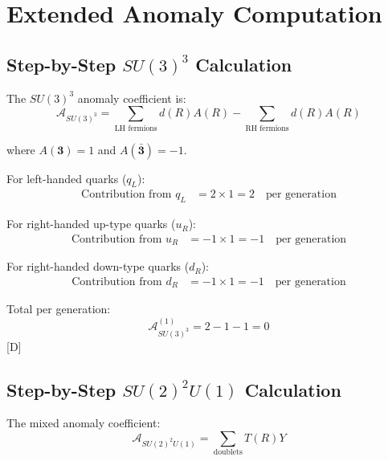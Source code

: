 \documentclass[11pt,a4paper]{article}
\newcommand{\tagD}{\textcolor{blue!70!black}{[D]}}
\begin{document}

\section{Extended Anomaly Computation}
\label{app:extended-anomaly}

\subsection{Step-by-Step $SU(3)^3$ Calculation}

The $SU(3)^3$ anomaly coefficient is:
\begin{equation}
\label{eq:su3-coeff-def}
\mathcal{A}_{SU(3)^3} = \sum_{\text{LH fermions}} d(R) A(R) - \sum_{\text{RH fermions}} d(R) A(R)
\end{equation}

where $A(\mathbf{3}) = 1$ and $A(\bar{\mathbf{3}}) = -1$.

For left-handed quarks ($q_L$):
\begin{align}
\label{eq:qL-su3-anom}
\text{Contribution from } q_L &= 2 \times 1 = 2 \quad \text{per generation}
\end{align}

For right-handed up-type quarks ($u_R$):
\begin{align}
\label{eq:uR-su3-anom}
\text{Contribution from } u_R &= -1 \times 1 = -1 \quad \text{per generation}
\end{align}

For right-handed down-type quarks ($d_R$):
\begin{align}
\label{eq:dR-su3-anom}
\text{Contribution from } d_R &= -1 \times 1 = -1 \quad \text{per generation}
\end{align}

Total per generation:
\begin{equation}
\label{eq:su3-per-gen}
\mathcal{A}_{SU(3)^3}^{(1)} = 2 - 1 - 1 = 0
\end{equation}
\tagD

\subsection{Step-by-Step $SU(2)^2 U(1)$ Calculation}

The mixed anomaly coefficient:
\begin{equation}
\label{eq:su2u1-def}
\mathcal{A}_{SU(2)^2 U(1)} = \sum_{\text{doublets}} T(R) Y
\end{equation}
\end{document}
